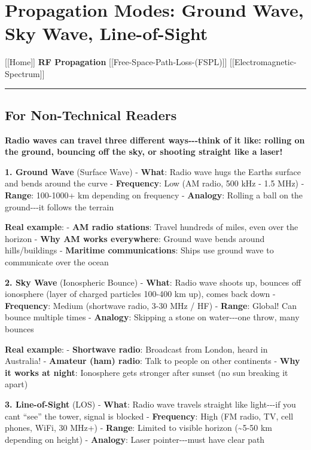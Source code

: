 \section{Propagation Modes: Ground Wave, Sky Wave,
Line-of-Sight}\label{propagation-modes-ground-wave-sky-wave-line-of-sight}

{[}{[}Home{]}{]} \textbar{} \textbf{RF Propagation} \textbar{}
{[}{[}Free-Space-Path-Loss-(FSPL){]}{]} \textbar{}
{[}{[}Electromagnetic-Spectrum{]}{]}

\begin{center}\rule{0.5\linewidth}{0.5pt}\end{center}

\subsection{\texorpdfstring{ For Non-Technical
Readers}{ For Non-Technical Readers}}\label{for-non-technical-readers}

\textbf{Radio waves can travel three different ways-\/-\/-think of it
like: rolling on the ground, bouncing off the sky, or shooting straight
like a laser!}

\textbf{1. Ground Wave} (Surface Wave) - \textbf{What}: Radio wave hugs
the Earth\textquotesingle s surface and bends around the curve -
\textbf{Frequency}: Low (AM radio, 500 kHz - 1.5 MHz) - \textbf{Range}:
100-1000+ km depending on frequency - \textbf{Analogy}: Rolling a ball
on the ground-\/-\/-it follows the terrain

\textbf{Real example}: - \textbf{AM radio stations}: Travel hundreds of
miles, even over the horizon - \textbf{Why AM works everywhere}: Ground
wave bends around hills/buildings - \textbf{Maritime communications}:
Ships use ground wave to communicate over the ocean

\textbf{2. Sky Wave} (Ionospheric Bounce) - \textbf{What}: Radio wave
shoots up, bounces off ionosphere (layer of charged particles 100-400 km
up), comes back down - \textbf{Frequency}: Medium (shortwave radio, 3-30
MHz / HF) - \textbf{Range}: Global! Can bounce multiple times -
\textbf{Analogy}: Skipping a stone on water-\/-\/-one throw, many
bounces

\textbf{Real example}: - \textbf{Shortwave radio}: Broadcast from
London, heard in Australia! - \textbf{Amateur (ham) radio}: Talk to
people on other continents - \textbf{Why it works at night}: Ionosphere
gets stronger after sunset (no sun breaking it apart)

\textbf{3. Line-of-Sight} (LOS) - \textbf{What}: Radio wave travels
straight like light-\/-\/-if you can\textquotesingle t ``see'' the
tower, signal is blocked - \textbf{Frequency}: High (FM radio, TV, cell
phones, WiFi, 30 MHz+) - \textbf{Range}: Limited to visible horizon
(\textasciitilde5-50 km depending on height) - \textbf{Analogy}: Laser
pointer-\/-\/-must have clear path

